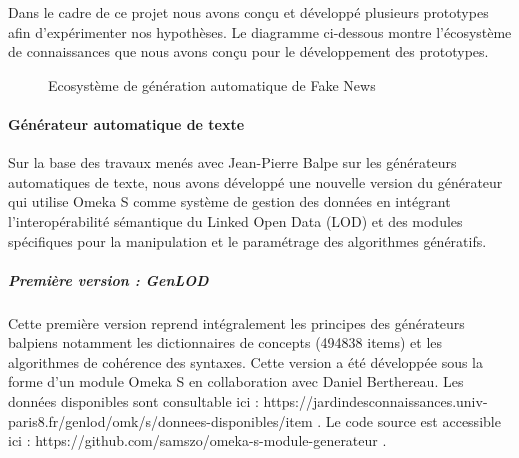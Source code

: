 \documentclass[
  a4paper,
  DIV=11,
  numbers=noendperiod]{scrreprt}
\let\oldparagraph\paragraph
\renewcommand{\paragraph}[1]{\oldparagraph{#1}\mbox{}}
\let\oldsubparagraph\subparagraph
\renewcommand{\subparagraph}[1]{\oldsubparagraph{#1}\mbox{}}
\begin{document}
Dans le cadre de ce projet nous avons conçu et développé plusieurs
prototypes afin d'expérimenter nos hypothèses. Le diagramme ci-dessous
montre l'écosystème de connaissances que nous avons conçu pour le
développement des prototypes.

\begin{figure}


\caption{\label{fig-iceGenerateurPolemika}Ecosystème de génération
automatique de Fake News}

\end{figure}%

\paragraph{Générateur automatique de
texte}\label{guxe9nuxe9rateur-automatique-de-texte}

Sur la base des travaux menés avec Jean-Pierre Balpe sur les générateurs
automatiques de texte, nous avons développé une nouvelle version du
générateur qui utilise Omeka S comme système de gestion des données en
intégrant l'interopérabilité sémantique du Linked Open Data (LOD) et des
modules spécifiques pour la manipulation et le paramétrage des
algorithmes génératifs.

\subparagraph{Première version :
GenLOD}\label{premiuxe8re-version-genlod}

Cette première version reprend intégralement les principes des
générateurs balpiens notamment les dictionnaires de concepts (494838
items) et les algorithmes de cohérence des syntaxes. Cette version a été
développée sous la forme d'un module Omeka S en collaboration avec
Daniel Berthereau. Les données disponibles sont consultable ici :
https://jardindesconnaissances.univ-paris8.fr/genlod/omk/s/donnees-disponibles/item
. Le code source est accessible ici :
https://github.com/samszo/omeka-s-module-generateur .
\end{document}
